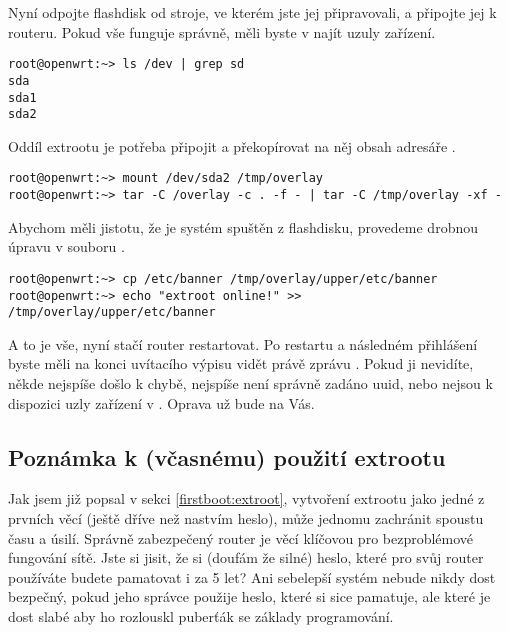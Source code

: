 Nyní odpojte flashdisk od stroje, ve kterém jste jej připravovali, a připojte
jej k routeru. Pokud vše funguje správně, měli byste v  najít uzuly
zařízení.
\begin{verbatim}
root@openwrt:~> ls /dev | grep sd
sda
sda1
sda2
\end{verbatim}

Oddíl extrootu je potřeba připojit a překopírovat na něj obsah adresáře .
\begin{verbatim}
root@openwrt:~> mount /dev/sda2 /tmp/overlay
root@openwrt:~> tar -C /overlay -c . -f - | tar -C /tmp/overlay -xf -
\end{verbatim}

Abychom měli jistotu, že je systém spuštěn z flashdisku, provedeme drobnou
úpravu v souboru .
\begin{verbatim}
root@openwrt:~> cp /etc/banner /tmp/overlay/upper/etc/banner
root@openwrt:~> echo "extroot online!" >> /tmp/overlay/upper/etc/banner
\end{verbatim}

A to je vše, nyní stačí router restartovat. Po restartu a následném přihlášení
byste měli na konci uvítacího výpisu vidět právě zprávu .
Pokud ji nevidíte, někde nejspíše došlo k chybě, nejspíše není správně zadáno
\gls{uuid}, nebo nejsou k dispozici uzly zařízení v . Oprava už bude
na Vás.

\subsection{Poznámka k (včasnému) použití extrootu}
Jak jsem již popsal v sekci \ref{firstboot:extroot}, vytvoření extrootu jako
jedné z prvních věcí (ještě dříve než nastvím heslo), může jednomu zachránit
spoustu času a úsilí. Správně zabezpečený router je věcí klíčovou pro bezproblémové
fungování sítě. Jste si jisit, že si (doufám že silné) heslo, které pro svůj
router používáte budete pamatovat i za 5 let? Ani sebelepší systém nebude
nikdy dost bezpečný, pokud jeho správce použije heslo, které si sice pamatuje,
ale které je dost slabé aby ho rozlouskl puberťák se základy programování.


